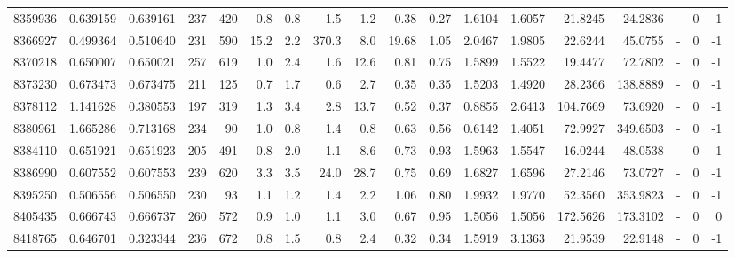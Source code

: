 \begin{tabular}{rrrrrrrrrrrrrrrlrr}
   8359936 & 0.639159 &   0.639161 &  237 &  420 &      0.8 &      0.8 &     1.5 &      1.2 &       0.38 &        0.27 &  1.6104 &  1.6057 &   21.8245 &   24.2836 &             - &        0 &         -1 \\
   8366927 & 0.499364 &   0.510640 &  231 &  590 &     15.2 &      2.2 &   370.3 &      8.0 &      19.68 &        1.05 &  2.0467 &  1.9805 &   22.6244 &   45.0755 &             - &        0 &         -1 \\
   8370218 & 0.650007 &   0.650021 &  257 &  619 &      1.0 &      2.4 &     1.6 &     12.6 &       0.81 &        0.75 &  1.5899 &  1.5522 &   19.4477 &   72.7802 &             - &        0 &         -1 \\
   8373230 & 0.673473 &   0.673475 &  211 &  125 &      0.7 &      1.7 &     0.6 &      2.7 &       0.35 &        0.35 &  1.5203 &  1.4920 &   28.2366 &  138.8889 &             - &        0 &         -1 \\
   8378112 & 1.141628 &   0.380553 &  197 &  319 &      1.3 &      3.4 &     2.8 &     13.7 &       0.52 &        0.37 &  0.8855 &  2.6413 &  104.7669 &   73.6920 &             - &        0 &         -1 \\
   8380961 & 1.665286 &   0.713168 &  234 &   90 &      1.0 &      0.8 &     1.4 &      0.8 &       0.63 &        0.56 &  0.6142 &  1.4051 &   72.9927 &  349.6503 &             - &        0 &         -1 \\
   8384110 & 0.651921 &   0.651923 &  205 &  491 &      0.8 &      2.0 &     1.1 &      8.6 &       0.73 &        0.93 &  1.5963 &  1.5547 &   16.0244 &   48.0538 &             - &        0 &         -1 \\
   8386990 & 0.607552 &   0.607553 &  239 &  620 &      3.3 &      3.5 &    24.0 &     28.7 &       0.75 &        0.69 &  1.6827 &  1.6596 &   27.2146 &   73.0727 &             - &        0 &         -1 \\
   8395250 & 0.506556 &   0.506550 &  230 &   93 &      1.1 &      1.2 &     1.4 &      2.2 &       1.06 &        0.80 &  1.9932 &  1.9770 &   52.3560 &  353.9823 &             - &        0 &         -1 \\
   8405435 & 0.666743 &   0.666737 &  260 &  572 &      0.9 &      1.0 &     1.1 &      3.0 &       0.67 &        0.95 &  1.5056 &  1.5056 &  172.5626 &  173.3102 &             - &        0 &          0 \\
   8418765 & 0.646701 &   0.323344 &  236 &  672 &      0.8 &      1.5 &     0.8 &      2.4 &       0.32 &        0.34 &  1.5919 &  3.1363 &   21.9539 &   22.9148 &             - &        0 &         -1 \\

\end{tabular}
